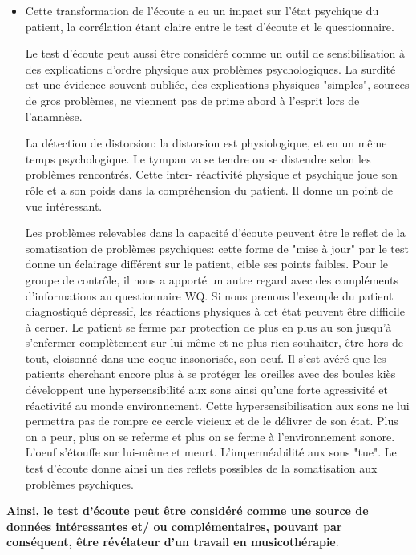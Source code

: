 \begin{itemize}
  \item Cette transformation de l'écoute a eu  un impact sur l'état
  psychique du patient, la corrélation étant claire entre le test d'écoute et le questionnaire.
  
  Le test d'écoute  peut aussi  être considéré comme un outil de sensibilisation à des explications 
  d'ordre physique aux problèmes psychologiques. La surdité est une évidence souvent oubliée, des 
  explications physiques "simples", sources de gros problèmes, ne viennent pas de prime abord à l'esprit 
  lors de l'anamnèse.
  
  La détection de distorsion:
  la distorsion est physiologique, et en un même temps psychologique. Le tympan va se tendre ou se 
  distendre 
  selon les problèmes rencontrés. Cette inter- réactivité physique et psychique joue son rôle et a son 
  poids dans la compréhension du patient. Il donne un point de vue intéressant.
  
  Les problèmes relevables dans la capacité d'écoute peuvent être  le reflet de la somatisation de 
  problèmes psychiques: 
  cette forme de  "mise  à jour" par le test donne un éclairage différent sur le patient, cible ses points 
  faibles. Pour le groupe de contrôle, il nous a
  apporté un autre regard avec des compléments d'informations au 
  questionnaire
  WQ.
  Si nous prenons l'exemple du patient diagnostiqué dépressif, les réactions physiques à cet état peuvent 
  être difficile à cerner. Le patient se ferme par protection de plus en plus au son jusqu'à s'enfermer 
  complètement sur lui-même et ne plus rien souhaiter, être hors de tout, cloisonné dans une coque 
  insonorisée, son oeuf. Il s'est avéré que les patients cherchant encore plus à se protéger les oreilles  
  avec des boules kiès développent une hypersensibilité aux sons ainsi qu'une forte agressivité et 
  réactivité au monde environnement. Cette hypersensibilisation aux sons ne lui permettra pas de rompre 
  ce cercle vicieux et de le délivrer de son état. Plus on a  peur, plus on se referme et plus on se ferme à 
  l'environnement sonore. L'oeuf  s'étouffe sur lui-même et meurt.
  L'imperméabilité aux sons "tue". 
  Le test d'écoute  donne ainsi un des reflets possibles de la somatisation aux  problèmes psychiques.
  
  
  \end{itemize}

  \textbf{Ainsi, le test
  d'écoute peut être considéré comme une source de données
   intéressantes et/ ou complémentaires, pouvant par conséquent, être
  \textbf{révélateur d'un
  travail en musicothérapie}}.








